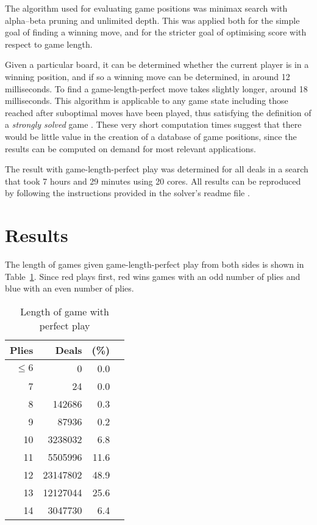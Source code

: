 \documentclass[a4paper, twocolumn]{article}
\begin{document}
The algorithm used for evaluating game positions was minimax search with
alpha--beta pruning and unlimited depth. This was applied both for the simple
goal of finding a winning move, and for the stricter goal of optimising score
with respect to game length.

Given a particular board, it can be determined whether the current player is in
a winning position, and if so a winning move can be determined, in around 12
milliseconds. To find a game-length-perfect move takes slightly longer, around
18 milliseconds. This algorithm is applicable to any game state including those
reached after suboptimal moves have been played, thus satisfying the definition
of a \textit{strongly solved} game \cite{games-solved}. These very short
computation times suggest that there would be little value in the creation of a
database of game positions, since the results can be computed on demand for most
relevant applications.

The result with game-length-perfect play was determined for all deals in a
search that took 7 hours and 29 minutes using 20 cores. All results can be
reproduced by following the instructions provided in the solver's readme file
\cite{github}.


\section{Results}

The length of games given game-length-perfect play from both sides is shown in
Table~\ref{tab:game-length}. Since red plays first, red wins games with an odd
number of plies and blue with an even number of plies.

\begin{table}[ht]
  \centering
  \begin{tabular}{r r r c}
    \hline
    \textbf{Plies} & \textbf{Deals} & \textbf{(\%)} \\
    \hline
    $\leq 6$ & 0 & 0.0 \\
    7 & 24 & 0.0 \\
    8 & 142686 & 0.3 \\
    9 & 87936 & 0.2 \\
    10 & 3238032 & 6.8 \\
    11 & 5505996 & 11.6 \\
    12 & 23147802 & 48.9 \\
    13 & 12127044 & 25.6 \\
    14 & 3047730 & 6.4 \\
    \hline
  \end{tabular}
  \caption{Length of game with perfect play}
  \label{tab:game-length}
\end{table}
\end{document}
